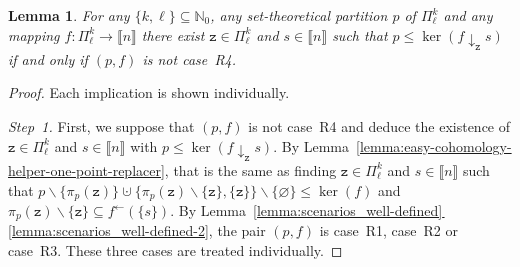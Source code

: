 \documentclass[10pt,a4paper]{amsart}
\numberwithin{equation}{section}
\newtheorem{Lemma}[Theorem]{Lemma}
\newcommand{\funcdef}{\colon}
\newcommand{\nnint}{{\mathbb{N}_0}}
\newcommand{\dwi}[1]{\llbracket{#1}\rrbracket}
\newcommand{\subproof}[1]{\textit{#1}}
\newcommand{\tsopx}[2]{\Pi^{#1}_{#2}}
\newcommand{\spimgx}[2]{#1^{\leftarrow}(#2)}
\newcommand{\finerthan}{\mathrel{\leq}}
\newcommand{\Yp}[1]{\mathtt{#1}}
\newcommand{\Yb}[1]{\mathsf{#1}}
\newcommand{\blo}[2]{\pi_{#1}(#2)}
\newcommand{\thedim}{n}
\newcommand{\scenarioone}{R1}
\newcommand{\scenariotwo}{R2}
\newcommand{\scenariothree}{R3}
\newcommand{\scenariofour}{R4}
\begin{document}
{
  \newcommand{\inlen}{k}
  \newcommand{\outlen}{\ell}
  \newcommand{\theind}{f}
  \newcommand{\theindx}[1]{f(#1)}
  \newcommand{\thepoint}{\Yp{z}}
  \newcommand{\thevalue}{s}
  \newcommand{\thepartition}{p}
  \newcommand{\thealtered}{\theind\downarrow_\thepoint\thevalue}
  \newcommand{\theblock}{\blo{\thepartition}{\thepoint}}
  \newcommand{\cutblock}{\blo{\thepartition}{\thepoint}\backslash \{\thepoint\}}
  \newcommand{\sing}{\{\thepoint\}}
  \newcommand{\thelong}{\Yb{Z}}
  \newcommand{\firstspecialpoint}{\Yp{z}_1}
  \newcommand{\secondspecialpoint}{\Yp{z}_2}
  \newcommand{\thegood}{f}
  \newcommand{\theonevalue}{s_1}
  \newcommand{\theothervalue}{s_2}
  \newcommand{\anypoint}{\Yp{y}}
  \newcommand{\someblock}{\Yb{A}}
  \newcommand{\anyblock}{\Yb{B}}
  \newcommand{\alternativefirstspecialpoint}{\Yp{z}_1'}
  \newcommand{\alternativesecondspecialpoint}{\Yp{z}_2'}
  \newcommand{\alternativelong}{\Yb{Z}'}
  \newcommand{\alternativepoint}{\Yp{z}'}
  \newcommand{\alternativevalue}{s'}
  \newcommand{\alternativeanypoint}{\Yp{y}'}
  \begin{Lemma}
    \label{lemma:easy-cohomology-helper-non-trivial-polynomials}
    For any ${\{\inlen,\outlen\}\subseteq \nnint}$, any set-theoretical partition $\thepartition$ of $\tsopx{\inlen}{\outlen}$ and any mapping $\theind\funcdef\tsopx{\inlen}{\outlen}\to \dwi{\thedim}$ there exist $\thepoint\in\tsopx{\inlen}{\outlen}$ and $\thevalue\in\dwi{\thedim}$ such that $\thepartition\finerthan\ker(\thealtered)$  if and only if $(\thepartition,\theind)$ is not case~\scenariofour.
\end{Lemma}
\begin{proof}
  Each implication is shown individually.

  \subproof{Step~1.} First, we suppose that $(\thepartition,\theind)$ is not case~\scenariofour{}
  and deduce the existence of $\thepoint\in\tsopx{\inlen}{\outlen}$ and $\thevalue\in\dwi{\thedim}$ with $\thepartition\finerthan\ker(\thealtered)$. By Lem\-ma~\ref{lemma:easy-cohomology-helper-one-point-replacer}, that is the same as finding $\thepoint\in\tsopx{\inlen}{\outlen}$ and $\thevalue\in\dwi{\thedim}$ such that $\thepartition\backslash \{\theblock\}\cupdot \{\cutblock,\sing\}\backslash \{\varnothing\}\finerthan \ker(\theind)$ and $\cutblock\subseteq \spimgx{\theind}{\{\thevalue\}}$. By Lem\-ma~\hyperref[lemma:scenarios_well-defined-2]{\ref*{lemma:scenarios_well-defined}\,\ref*{lemma:scenarios_well-defined-2}}, the pair $(\thepartition,\theind)$ is case~\scenarioone{}, case~\scenariotwo{} or case~\scenariothree{}. These three cases are treated individually.


\end{proof}}
\end{document}
